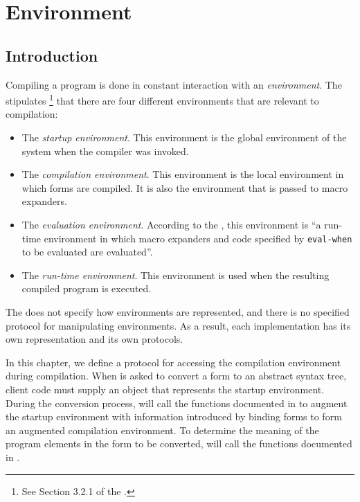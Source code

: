 \chapter{Environment}
\label{chap-environment}

\section{Introduction}

Compiling a \cl{} program is done in constant interaction with an
\emph{environment}.  The \hs{} stipulates%
\footnote{See Section 3.2.1 of the \hs{}.}
that there are four different environments that are relevant to
compilation:

\begin{itemize}
\item The \emph{startup environment}.  This environment is the global
  environment of the \cl{} system when the compiler was invoked.
\item The \emph{compilation environment}.  This environment is the
  local environment in which forms are compiled.  It is also the
  environment that is passed to macro expanders.
\item The \emph{evaluation environment}.  According to the \hs{}, this
  environment is ``a run-time environment in which macro expanders and
  code specified by \texttt{eval-when} to be evaluated are
  evaluated''. 
\item The \emph{run-time environment}.  This environment is used when
  the resulting compiled program is executed.
\end{itemize}

The \hs{} does not specify how environments are represented, and there
is no specified protocol for manipulating environments.  As a result,
each implementation has its own representation and its own protocols. 

In this chapter, we define a protocol for accessing the compilation
environment during compilation.  When \sysname{} is asked to convert a
form to an abstract syntax tree, client code must supply an object
that represents the startup environment.  During the conversion
process, \sysname{} will call the functions documented in
 to augment the startup environment
with information introduced by binding forms to form an augmented
compilation environment.  To determine the meaning of the program
elements in the form to be converted, \sysname{} will call the
functions documented in .  

